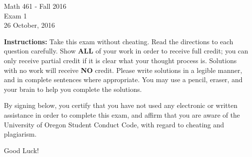 \documentclass[addpoints]{exam}
\begin{document}
	\begin{coverpages}
		\begin{center}
			\Large{Math 461 - Fall 2016} \\
			\Large{Exam 1} \\
			\Large{26 October, 2016}
		\end{center}
		\vspace{0.1in}
		
		\begin{center}
			\vspace{0.1in}
		
			\vspace{0.1in}
		\end{center}
		
		\textbf{Instructions:} Take this exam without cheating. Read the directions to each question carefully. Show \textbf{ALL} of your work in order to receive full credit; you can only receive partial credit if it is clear what your thought process is. Solutions with no work will receive \textbf{NO} credit. Please write solutions in a legible manner, and in complete sentences where appropriate. You may use a pencil, eraser, and your brain to help you complete the solutions. 
		
		By signing below, you certify that you have not used any electronic or written assistance in order to complete this exam, and affirm that you are aware of the University of Oregon Student Conduct Code, with regard to cheating and plagiarism.
		
		Good Luck!
		
		\begin{center}
			\vspace{0.1in}
		\end{center}
	
		\begin{center}
			\gradetable[v][questions]
		\end{center}
		\vspace{0.5in}
	\end{coverpages}
	
\end{document}
